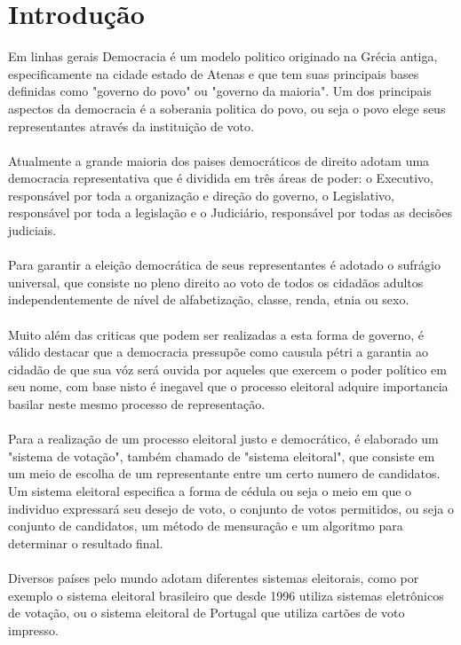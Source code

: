 \section{Introdução}
Em linhas gerais Democracia é um modelo politico originado na Grécia antiga, 
especificamente na cidade estado de Atenas e que tem suas principais bases 
definidas como "governo do povo" ou "governo da maioria". Um dos principais aspectos
da democracia é a soberania politica do povo, ou seja o povo elege seus representantes
através da instituição de voto. \\ \\
Atualmente a grande maioria dos paises democráticos de direito adotam uma 
democracia representativa que é dividida em três áreas de poder: o Executivo, responsável por toda a organização
e direção do governo, o Legislativo, responsável por toda a legislação e o Judiciário,
responsável por todas as decisões judiciais. \\ \\
Para garantir a eleição democrática de seus representantes é adotado o sufrágio 
universal, que consiste no pleno direito ao voto de todos os cidadãos adultos 
independentemente de nível de alfabetização, classe, renda, etnia ou sexo. \\ \\
Muito além das criticas que podem ser realizadas a esta forma de governo, é válido
destacar que a democracia pressupõe como causula pétri a garantia ao cidadão de
que sua vóz será ouvida por aqueles que exercem o poder político em seu nome, 
com base nisto é inegavel que o processo eleitoral adquire importancia basilar
neste mesmo processo de representação. \\ \\
Para a realização de um processo eleitoral justo e democrático, é elaborado um 
"sistema de votação", também chamado de "sistema eleitoral", que consiste em um
meio de escolha de um representante entre um certo numero de candidatos.
Um sistema eleitoral especifica a forma de cédula ou seja o meio em que o individuo
expressará seu desejo de voto, o conjunto de votos permitidos, ou seja o conjunto 
de candidatos, um método de mensuração e um algoritmo para determinar o 
resultado final. \\ \\
Diversos países pelo mundo adotam diferentes sistemas eleitorais, como por exemplo
o sistema eleitoral brasileiro que desde 1996 utiliza sistemas eletrônicos de votação,
ou o sistema eleitoral de Portugal que utiliza cartões de voto impresso.
